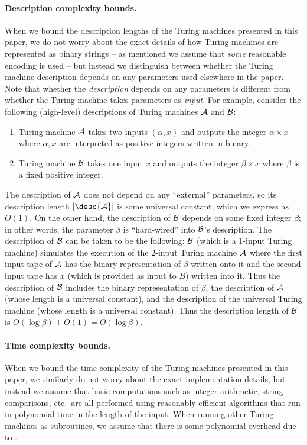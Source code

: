 \paragraph{Description complexity bounds.} When we bound the description lengths of
the Turing machines presented in this paper, we do not worry about the exact
details of how Turing machines are represented as binary strings -- as mentioned we assume that
\emph{some} reasonable encoding is used -- but instead
we distinguish between whether the Turing machine 
description depends on any parameters used elsewhere in the paper. Note that whether the \emph{description} depends on any parameters is different from whether the Turing machine takes parameters as \emph{input}. For example, consider the following (high-level) descriptions of Turing machines $\cal{A}$ and $\cal{B}$:

\begin{enumerate}
	\item Turing machine $\cal{A}$ takes two inputs $(\alpha,x)$ and outputs the integer $\alpha \times x$ where $\alpha, x$ are interpreted as positive integers written in binary. 
	\item Turing machine $\cal{B}$ takes one input $x$ and outputs the integer $\beta \times x$ where $\beta$ is a fixed positive integer.
\end{enumerate}

The description of $\cal{A}$ does not depend on any ``external'' parameters, so its description length $|\desc{\cal{A}}|$ is some universal constant, which we express as $O(1)$. On the other hand, the description of $\cal{B}$ depends on some fixed integer $\beta$; in other words, the parameter $\beta$ is ``hard-wired'' into $\cal{B}$'s description. The description of $\cal{B}$ can be taken to be the following: $\cal{B}$ (which is a $1$-input Turing machine) simulates the execution of the $2$-input Turing machine $\cal{A}$ where the first input tape of $\cal{A}$ has the binary representation of $\beta$ written onto it and the second input tape has $x$ (which is provided as input to $B$) written into it. Thus the description of $\cal{B}$ includes the binary representation of $\beta$, the description of $\cal{A}$ (whose length is a universal constant), and the description of the universal Turing machine (whose length is a universal constant). Thus the description length of $\cal{B}$ is $O(\log \beta) + O(1) = O(\log \beta)$.



\paragraph{Time complexity bounds.} When we bound the time complexity of the Turing machines presented in this paper, we similarly do not worry about the exact
implementation details, but instead we assume that basic computations such as integer arithmetic, string comparisons, etc.\ are all performed
using reasonably efficient algorithms that run in polynomial time in the length of the input. When running other Turing machines as subroutines, we assume that there is some polynomial overhead due to .


